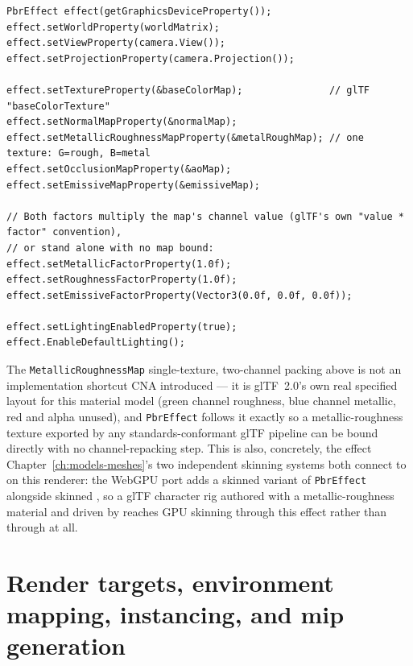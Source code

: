 \begin{lstlisting}
PbrEffect effect(getGraphicsDeviceProperty());
effect.setWorldProperty(worldMatrix);
effect.setViewProperty(camera.View());
effect.setProjectionProperty(camera.Projection());

effect.setTextureProperty(&baseColorMap);               // glTF "baseColorTexture"
effect.setNormalMapProperty(&normalMap);
effect.setMetallicRoughnessMapProperty(&metalRoughMap); // one texture: G=rough, B=metal
effect.setOcclusionMapProperty(&aoMap);
effect.setEmissiveMapProperty(&emissiveMap);

// Both factors multiply the map's channel value (glTF's own "value * factor" convention),
// or stand alone with no map bound:
effect.setMetallicFactorProperty(1.0f);
effect.setRoughnessFactorProperty(1.0f);
effect.setEmissiveFactorProperty(Vector3(0.0f, 0.0f, 0.0f));

effect.setLightingEnabledProperty(true);
effect.EnableDefaultLighting();
\end{lstlisting}

The \texttt{MetallicRoughnessMap} single-texture, two-channel packing above is not an
implementation shortcut CNA introduced --- it is glTF~2.0's own real specified layout for this
material model (green channel roughness, blue channel metallic, red and alpha unused), and
\texttt{PbrEffect} follows it exactly so a metallic-roughness texture exported by any
standards-conformant glTF pipeline can be bound directly with no channel-repacking step. This
is also, concretely, the effect Chapter~\ref{ch:models-meshes}'s two independent skinning
systems both connect to on this renderer: the WebGPU port adds a skinned variant of
\texttt{PbrEffect} alongside skinned , so a glTF character rig
authored with a metallic-roughness material and driven by  reaches
GPU skinning through this effect rather than through  at all.

\section{Render targets, environment mapping, instancing, and mip generation}

